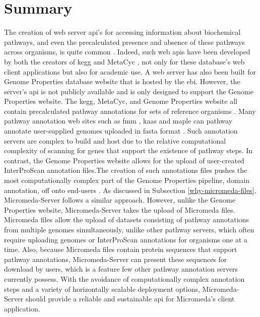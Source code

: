 \section{Summary} \label{server-summary}

The creation of web server \gls{api}'s for accessing information about 
biochemical pathways, and even the precalculated presence and absence of these 
pathways across organisms, is quite common 
\cite{wu2006kobas,moriya2010pathpred,pireddu2006path,vallenet2009microscope,aziz2008rast,takami2016automated,moriya2007kaas,chou2009fmm}. 
Indeed, such web \gls{api}s have been developed by both the creators of 
\gls{kegg} \cite{kawashima2003kegg} and MetaCyc \cite{karp2013data}, not only 
for these database's web client applications but also for academic use. A web 
server has also been built for Genome Properties database website 
\cite{richardson2018genome} that is hosted by the \gls{ebi}. However, the 
server's \gls{api} is not publicly available and is only designed to support the 
Genome Properties website. The \gls{kegg}, MetaCyc, and Genome Properties 
website all contain precalculated pathway annotations for sets of reference 
organisms \cite{kanehisa2000kegg,karp2002metacyc,karp2013data}. Many pathway 
annotation web sites such as \gls{fmm} \cite{chou2009fmm}, \gls{kaas} 
\cite{moriya2007kaas} and \gls{maple} \cite{takami2016automated} can pathway 
annotate user-supplied genomes uploaded in \gls{fasta} format 
\cite{pearson19905}. Such annotation servers are complex to build and host due 
to the relative computational complexity of scanning for genes that support the 
existence of pathway steps. In contrast, the Genome Properties website allows 
for the upload of user-created InterProScan annotation files.The creation of 
such annotations files pushes the most computationally complex part of the 
Genome Properties pipeline, domain annotation, off onto end-users 
\cite{richardson2018genome}. As discussed in Subsection 
\ref{why-micromeda-files}, Micromeda-Server follows a similar approach. However, 
unlike the Genome Properties website, Micromeda-Server takes the upload of 
Micromeda files. Micromeda files allow the upload of datasets consisting of 
pathway annotations from multiple genomes simultaneously, unlike other pathway 
servers, which often require uploading genomes or InterProScan annotations for 
organisms one at a time. Also, because Micromeda files contain protein sequences 
that support pathway annotations, Micromeda-Server can present these sequences 
for download by users, which is a feature few other pathway annotation servers 
currently possess. With the avoidance of computationally complex annotation 
steps and a variety of horizontally scalable deployment options, 
Micromeda-Server should provide a reliable and sustainable \gls{api} for 
Micromeda's client application.
